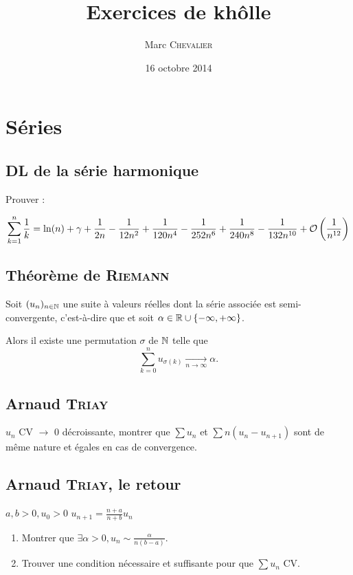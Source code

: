 

\title{Exercices de khôlle}
\author{Marc \textsc{Chevalier}}
\date{16 octobre 2014}


\maketitle
\setcounter{tocdepth}{2}
\tableofcontents

\section{Séries}

\subsection{DL de la série harmonique}

Prouver :

\[
    \sum_{k=1}^n \frac{1}{k}= \ln(n)+\gamma+\frac{1}{2n}-\frac{1}{12n^2}+\frac{1}{120n^4}-\frac{1}{252n^6}+\frac{1}{240n^8}-\frac{1}{132n^{10}}+\mathcal{O}\left(\frac1{n^{12}}\right)
\]

\subsection{Théorème de \textsc{Riemann}}

Soit $(u_n)_{n\in\mathbb{N}}$ une suite à valeurs réelles dont la série associée est semi-convergente, c'est-à-dire que et soit
$\alpha\in\mathbb{R}\cup\{-\infty,+\infty\}$.

Alors il existe une permutation $\sigma$ de $\mathbb{N}$ telle que
$$\sum_{k=0}^nu_{\sigma(k)}\underset{n\to\infty}{\longrightarrow}\alpha.$$

\subsection{Arnaud \textsc{Triay}}

$u_n$ CV $\to$ 0 décroissante, montrer que $\sum u_n$ et $\sum n(u_n - u_{n+1})$ sont de même nature et égales en cas de convergence.

\subsection{Arnaud \textsc{Triay}, le retour}

$a, b > 0, u_0 > 0$
$u_{n+1} = \frac{n+a}{n+b}u_n$
\begin{enumerate}
    \item Montrer que $\exists \alpha > 0, u_n \sim \frac{\alpha}{n(b-a)}$.
    \item Trouver une condition nécessaire et suffisante pour que $\sum u_n$ CV.
\end{enumerate}


